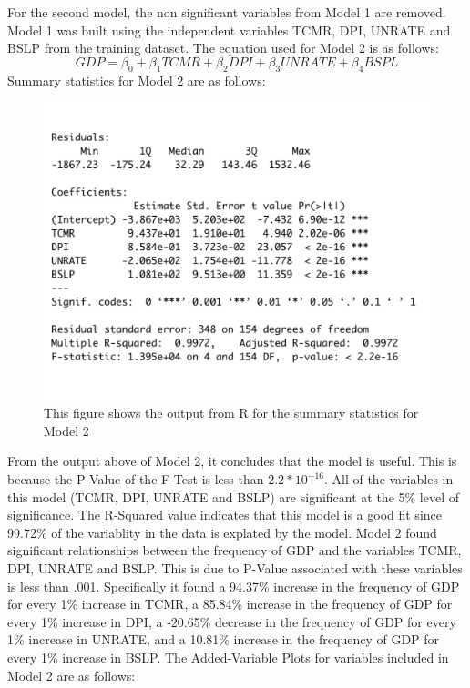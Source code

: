\documentclass[12pt]{article}
\begin{document}
For the second model, the non significant variables from Model 1 are removed. 
Model 1 was built using the independent variables TCMR, DPI, UNRATE and BSLP from the training dataset. 
The equation used for Model 2 is as follows:
\begin{equation}
  GDP = \beta_0 + \beta_1TCMR+ \beta_2 DPI + \beta_3 UNRATE + \beta_4 BSPL
\end{equation}
Summary statistics for Model 2 are as follows:
\begin{figure}[H]
  \centering
  \includegraphics[scale = .5]{mod2output}
  \caption{This figure shows the output from R for the summary statistics for Model 2}
\end{figure}
From the output above of Model 2, it concludes that the model is useful.
This is because the P-Value of the F-Test is less than $2.2 * 10^{-16}$.
All of the variables in this model (TCMR, DPI, UNRATE and BSLP) are significant at the 5\% level of significance.
The R-Squared value indicates that this model is a good fit since 99.72\% of the variablity in the data is explated by the model. 
Model 2 found significant relationships between the frequency of GDP and the variables TCMR, DPI, UNRATE and BSLP. 
This is due to P-Value associated with these variables is less than .001. 
Specifically it found a 94.37\% increase in the frequency of GDP for every 1\% increase in TCMR, a 85.84\% increase in the frequency of GDP for every 1\% increase in DPI, a -20.65\% decrease in the frequency of GDP for every 1\% increase in UNRATE, and a 10.81\% increase in the frequency of GDP for every 1\% increase in BSLP.
The Added-Variable Plots for variables included in Model 2 are as follows: 
\end{document}
